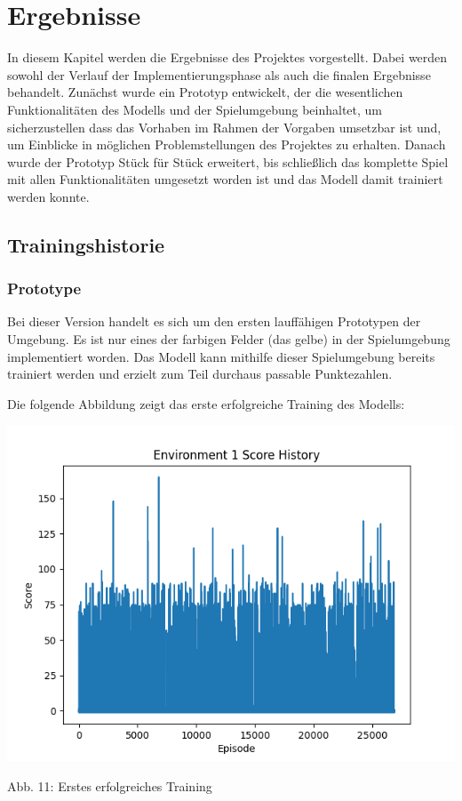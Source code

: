 \section{Ergebnisse}
In diesem Kapitel werden die Ergebnisse des Projektes vorgestellt. Dabei werden sowohl der Verlauf der Implementierungsphase als auch die finalen Ergebnisse behandelt. Zunächst wurde ein Prototyp entwickelt, der die wesentlichen Funktionalitäten des Modells und der Spielumgebung beinhaltet, um sicherzustellen dass das Vorhaben im Rahmen der Vorgaben umsetzbar ist und, um Einblicke in möglichen Problemstellungen des Projektes zu erhalten. Danach wurde der Prototyp Stück für Stück erweitert, bis schließlich das komplette Spiel mit allen Funktionalitäten umgesetzt worden ist und das Modell damit trainiert werden konnte.
\subsection{Trainingshistorie}
\subsubsection{Prototype}
Bei dieser Version handelt es sich um den ersten lauffähigen Prototypen der Umgebung. Es ist nur eines der farbigen Felder (das gelbe) in der Spielumgebung implementiert worden. Das Modell kann mithilfe dieser Spielumgebung bereits trainiert werden und erzielt zum Teil durchaus passable Punktezahlen.

\begin{minipage}{\linewidth}
	Die folgende Abbildung zeigt das erste erfolgreiche Training des Modells:
	
	\vspace{0.5cm}
	\includegraphics[width=1\textwidth]{Bilder/firstpropertraining}
	
	Abb. 11: Erstes erfolgreiches Training\\
\end{minipage}

